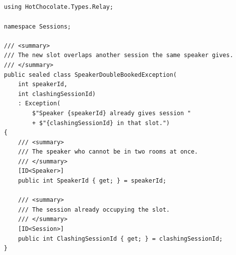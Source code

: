 \subsection*{}
\begin{verbatim}
using HotChocolate.Types.Relay;

namespace Sessions;

/// <summary>
/// The new slot overlaps another session the same speaker gives.
/// </summary>
public sealed class SpeakerDoubleBookedException(
    int speakerId,
    int clashingSessionId)
    : Exception(
        $"Speaker {speakerId} already gives session "
        + $"{clashingSessionId} in that slot.")
{
    /// <summary>
    /// The speaker who cannot be in two rooms at once.
    /// </summary>
    [ID<Speaker>]
    public int SpeakerId { get; } = speakerId;

    /// <summary>
    /// The session already occupying the slot.
    /// </summary>
    [ID<Session>]
    public int ClashingSessionId { get; } = clashingSessionId;
}
\end{verbatim}

